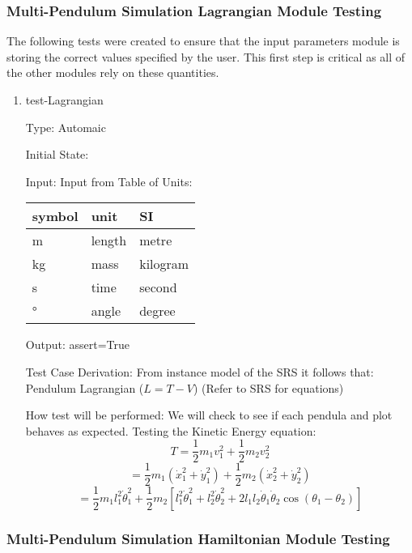 \documentclass[12pt, titlepage]{article}
\newcommand{\progname}{Multi-Pendulum Simulation }
\begin{document}
\subsubsection{\progname Lagrangian Module Testing}

The following tests were created to ensure that the input parameters module is 
storing the correct values specified by the user. This first step is critical 
as all of the other modules rely on these quantities.

\begin{enumerate}				
	\item{test-Lagrangian\\}
	
	Type: Automaic
	
	Initial State: 
	
	Input: Input from Table of Units:\\
  \noindent \begin{tabular}{l l l} 
    \toprule		
    \textbf{symbol} & \textbf{unit} & \textbf{SI}\\
    \midrule 
    \si{\metre} & length & metre\\
    \si{\kilogram} & mass & kilogram\\
    \si{\second} & time & second\\
    \si{\degree} & angle & degree\\
    \bottomrule
  \end{tabular}
	
	Output: assert=True
	
	Test Case Derivation: From instance model of the SRS it follows that:
	Pendulum Lagrangian ($L=T-V$)
	(Refer to SRS for equations)
	
	How test will be performed: We will check to see if each pendula and plot behaves as expected.
	Testing the Kinetic Energy equation:
	$$ T = \displaystyle\frac{1}{2}m_1v_1^2 + \frac{1}{2}m_2v_2^2 $$
$$ = \frac{1}{2}m_1(\dot{x}_1^2 + \dot{y}_1^2) + \frac{1}{2}m_2(\dot{x}_2^2 +
\dot{y}_2^2) $$
$$ = \frac{1}{2}m_1 l_1^2 \dot{\theta}_1^2 + \frac{1}{2}m_2\left[l_1^2
\dot{\theta}_1^2 + l_2^2 \dot{\theta}_2^2 + 2l_1l_2\dot{\theta}_1\dot{\theta}_2
\cos(\theta_1 - \theta_2)\right]$$
			
\end{enumerate} 

\subsubsection{\progname Hamiltonian Module Testing}
\end{document}
